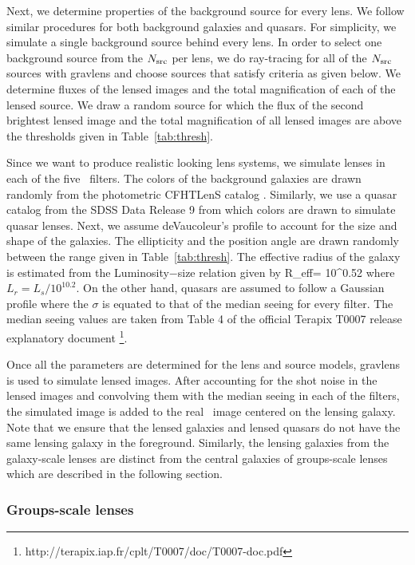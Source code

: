 \documentclass[useAMS,usenatbib,a4paper]{mn2e}
\begin{document}
Next, we determine properties of the background source for every lens. We follow
similar procedures for both background galaxies and quasars. For simplicity, we
simulate a single background source behind every lens. In order to select one
background source from the $N_{\rm src}$ per lens, we do ray-tracing for all of the
$N_{\rm src}$ sources with {\sc gravlens} \citep{Keeton2000} and choose sources that
satisfy criteria as given below. We determine fluxes of the lensed images
and the total magnification of each of the lensed source. We draw a random
source for which the flux of the second brightest lensed image and the total
magnification of all lensed images are above the thresholds given in
Table~\ref{tab:thresh}.

Since we want to produce realistic looking lens systems, we simulate lenses in
each of the five \cfhtls~filters. The colors of the background galaxies are drawn
randomly from the photometric CFHTLenS catalog
\citep{Hildebrandt2012,Erben2013}.  Similarly, we use a quasar catalog from the
SDSS Data Release 9 \citep{Paris2012} from which colors are drawn to simulate
quasar lenses. Next, we assume deVaucoleur's profile to account for the size
and shape of the galaxies. The ellipticity and the position angle are drawn
randomly between the range given in Table~\ref{tab:thresh}. The effective
radius of the galaxy is estimated from the Luminosity$-$size relation
\citep{Bernardi2003} given by 
\be
R_{\rm eff}= 10^{0.52} 
\ee
where $L_r=L_s/10^{10.2}$. On the other hand, quasars are assumed to follow a
Gaussian profile where the $\sigma$ is equated to that of the median seeing for
every filter. The median seeing values are taken from Table 4 of the official
Terapix T0007 release explanatory document \footnote{
    http://terapix.iap.fr/cplt/T0007/doc/T0007-doc.pdf}.  

Once all the parameters are determined for the lens and source models, {\sc
gravlens} is used to simulate lensed images.  After accounting for the shot
noise in the lensed images and convolving them with the median seeing in each of
the filters, the simulated image is added to the real \cfhtls~image centered
on the lensing galaxy. Note that we ensure that the lensed galaxies and
lensed quasars do not have the same lensing galaxy in the foreground. Similarly,
the lensing galaxies from the galaxy-scale lenses are distinct from the central
galaxies of groups-scale lenses which are described in the following section.


\subsubsection{Groups-scale lenses} 
\end{document}

